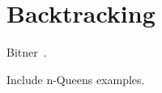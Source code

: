\section{Backtracking}
\label{sec:backtracking}

Bitner~\cite{Bitner:1975}.

Include n-Queens examples.


